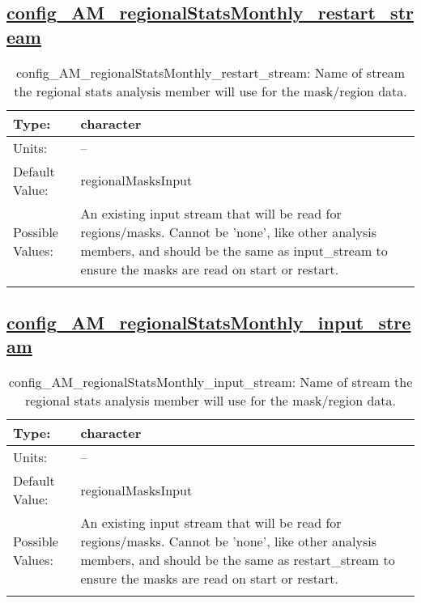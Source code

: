 \subsection[config\_AM\_regionalStatsMonthly\_restart\_stream]{\hyperref[sec:nm_tab_AM_regionalStatsMonthly]{config\_AM\_regionalStatsMonthly\_restart\_stream}}
\label{subsec:nm_sec_config_AM_regionalStatsMonthly_restart_stream}
\begin{center}
\begin{longtable}{| p{2.0in} || p{4.0in} |}
    \hline
    Type: & character \\
    \hline
    Units: & -- \\
    \hline
    Default Value: & regionalMasksInput \\
    \hline
    Possible Values: & An existing input stream that will be read for regions/masks. Cannot be 'none', like other analysis members, and should be the same as input\_stream to ensure the masks are read on start or restart. \\
    \hline
    \caption{config\_AM\_regionalStatsMonthly\_restart\_stream: Name of stream the regional stats analysis member will use for the mask/region data.}
\end{longtable}
\end{center}
\subsection[config\_AM\_regionalStatsMonthly\_input\_stream]{\hyperref[sec:nm_tab_AM_regionalStatsMonthly]{config\_AM\_regionalStatsMonthly\_input\_stream}}
\label{subsec:nm_sec_config_AM_regionalStatsMonthly_input_stream}
\begin{center}
\begin{longtable}{| p{2.0in} || p{4.0in} |}
    \hline
    Type: & character \\
    \hline
    Units: & -- \\
    \hline
    Default Value: & regionalMasksInput \\
    \hline
    Possible Values: & An existing input stream that will be read for regions/masks. Cannot be 'none', like other analysis members, and should be the same as restart\_stream to ensure the masks are read on start or restart. \\
    \hline
    \caption{config\_AM\_regionalStatsMonthly\_input\_stream: Name of stream the regional stats analysis member will use for the mask/region data.}
\end{longtable}
\end{center}
